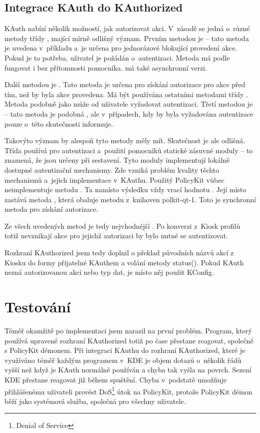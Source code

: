 \subsection*{Integrace KAuth do KAuthorized}
KAuth nabízí několik možností, jak autorizovat akci. V~zásadě se jedná o~různé metody třídy , mající mírně odlišný význam. Prvním metodou je  -- tato metoda je uvedena v~příkladu \cite{Kauth-usage} a~je určena pro jednorázové blokující provedení akce. Pokud je to potřeba, uživatel je požádán o~autentizaci. Metoda má podle \cite{Kauth-usage} fungovat i bez přítomnosti pomocníka.  má také asynchronní verzi.

Další metodou je . Tato metoda je určena pro získání autorizace pro akce před tím, než by byla akce provedena. Má být používána ostatními metodami třídy .  Metoda podobně jako  může od uživatele vyžadovat autentizaci. Třetí metodou je  -- tato metoda je podobná , ale v~případech, kdy by byla vyžadována autentizace pouze o~této skutečnosti informuje.

Takovýto význam by alespoň tyto metody měly mít. Skutečnost je ale odlišná. Třída  používá pro autentizaci a~použití pomocníků statické zásuvné moduly -- to znamená, že jsou určeny při sestavení. Tyto moduly implementují lokálně dostupné autentizační mechanismy. Zde vzniká problém kvality těchto mechanismů a~jejich implementace v~KAuthu. Použitý PolicyKit vůbec neimplementuje metodu . Ta namísto výsledku vždy vrací hodnotu . Její místo zastává metoda , která obaluje metodu  z~knihoven polkit-qt-1. Toto je synchronní metoda pro získání autorizace.

Ze všech uvedených metod je tedy nejvhodnější . Po konverzi z~Kiosk profilů totiž nevznikají akce pro jejichž autorizaci by bylo nutné se autentizovat.

Rozhraní KAuthorized jsem tedy doplnil o překlad původních názvů akcí z Kiosku do formy přijatelné KAuthem a volání metody status(). Pokud KAuth nezná autorizovanou akci nebo typ dat, je místo něj použit KConfig.

\section{Testování}
Téměř okamžitě po implementaci jsem narazil na první problém. Program, který používá upravené rozhraní KAuthorized totiž po čase přestane reagovat, společně s PolicyKit démonem. Při integraci KAuthu do rozhraní KAuthorized, které je využíváno téměř každým programem v~KDE je objem dotazů o~několik řádů vyšší než když je KAuth normálně používán a chyba tak vyšla na povrch. Sezení KDE přestane reagovat již během spuštění. Chyba v~podstatě umožňuje přihlášenému uživateli provést DoS\footnote{Denial of Service} útok na PolicyKit, protože PolicyKit démon běží jako systémová služba, společná pro všechny uživatele.

